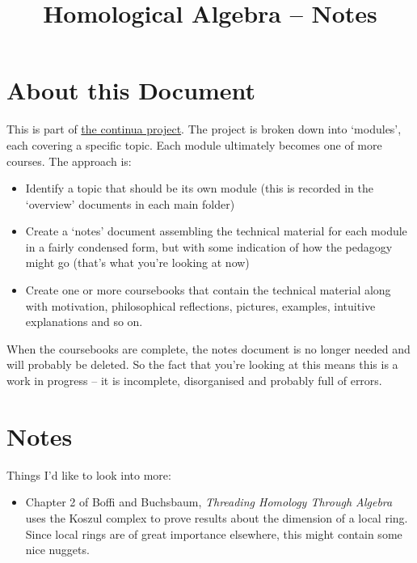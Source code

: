\documentclass[oneside,english]{amsbook}
\numberwithin{section}{chapter}
\theoremstyle{plain}
\theoremstyle{definition}
\begin{document}
	
	\title{Homological Algebra -- Notes}
	
	\maketitle
	
	\tableofcontents
	
	\chapter*{About this Document}
	
	This is part of \href{https://github.com/FineArtMaths/continua}{the continua project}. The project is broken down into `modules', each covering a specific topic. Each module ultimately becomes one of more courses. The approach is:
	
	\begin{itemize}
		\item{Identify a topic that should be its own module (this is recorded in the `overview' documents in each main folder)}
		\item{Create a `notes' document assembling the technical material for each module in a fairly condensed form, but with some indication of how the pedagogy might go (that's what you're looking at now)}
		\item{Create one or more coursebooks that contain the technical material along with motivation, philosophical reflections, pictures, examples, intuitive explanations and so on.}
	\end{itemize}
	
	When the coursebooks are complete, the notes document is no longer needed and will probably be deleted. So the fact that you're looking at this means this is a work in progress -- it is incomplete, disorganised and probably full of errors.

	\chapter*{Notes}
	
		Things I'd like to look into more:
		\begin{itemize}
			\item Chapter 2 of Boffi and Buchsbaum, \textit{Threading Homology Through Algebra} uses the Koszul complex to prove results about the dimension of a local ring. Since local rings are of great importance elsewhere, this might contain some nice nuggets.
		\end{itemize}
\end{document}
